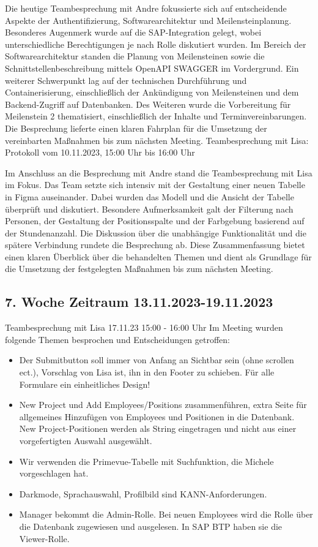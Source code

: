 \documentclass{article}
\begin{document}
Die heutige Teambesprechung mit Andre fokussierte sich auf entscheidende
Aspekte der Authentifizierung, Softwarearchitektur und Meilensteinplanung.
Besonderes Augenmerk wurde auf die SAP-Integration gelegt, wobei
unterschiedliche Berechtigungen je nach Rolle diskutiert wurden. Im Bereich der
Softwarearchitektur standen die Planung von Meilensteinen sowie die
Schnittstellenbeschreibung mittels OpenAPI SWAGGER im Vordergrund. Ein weiterer
Schwerpunkt lag auf der technischen Durchführung und Containerisierung,
einschließlich der Ankündigung von Meilensteinen und dem Backend-Zugriff auf
Datenbanken. Des Weiteren wurde die Vorbereitung für Meilenstein 2
thematisiert, einschließlich der Inhalte und Terminvereinbarungen. Die
Besprechung lieferte einen klaren Fahrplan für die Umsetzung der vereinbarten
Maßnahmen bis zum nächsten Meeting. Teambesprechung mit Lisa: Protokoll vom
10.11.2023, 15:00 Uhr bis 16:00 Uhr

Im Anschluss an die Besprechung mit Andre stand die Teambesprechung mit Lisa im
Fokus. Das Team setzte sich intensiv mit der Gestaltung einer neuen Tabelle in
Figma auseinander. Dabei wurden das Modell und die Ansicht der Tabelle
überprüft und diskutiert. Besondere Aufmerksamkeit galt der Filterung nach
Personen, der Gestaltung der Positionsspalte und der Farbgebung basierend auf
der Stundenanzahl. Die Diskussion über die unabhängige Funktionalität und die
spätere Verbindung rundete die Besprechung ab. Diese Zusammenfassung bietet
einen klaren Überblick über die behandelten Themen und dient als Grundlage für
die Umsetzung der festgelegten Maßnahmen bis zum nächsten Meeting.

\subsection{7. Woche Zeitraum 13.11.2023-19.11.2023}
Teambesprechung mit Lisa 17.11.23 15:00 - 16:00 Uhr Im Meeting wurden folgende
Themen besprochen und Entscheidungen getroffen:
\begin{itemize}
    \item Der Submitbutton soll immer von Anfang an Sichtbar sein (ohne scrollen ect.),
          Vorschlag von Lisa ist, ihn in den Footer zu schieben. Für alle Formulare ein
          einheitliches Design!
    \item 	New Project und Add Employees/Positions zusammenführen, extra Seite für
          allgemeines Hinzufügen von Employees und Positionen in die Datenbank. New
          Project-Positionen werden als String eingetragen und nicht aus einer
          vorgefertigten Auswahl ausgewählt.
    \item 	Wir verwenden die Primevue-Tabelle mit Suchfunktion, die Michele vorgeschlagen
          hat.
    \item 	Darkmode, Sprachauswahl, Profilbild sind KANN-Anforderungen.
    \item 	Manager bekommt die Admin-Rolle. Bei neuen Employees wird die Rolle über die
          Datenbank zugewiesen und ausgelesen. In SAP BTP haben sie die Viewer-Rolle.
\end{itemize}
\end{document}
